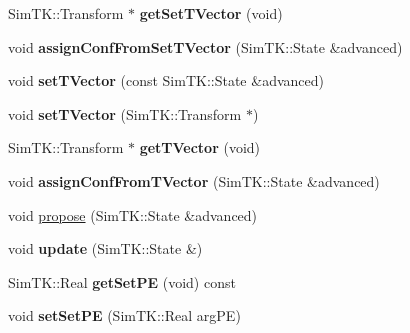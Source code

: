 \begin{DoxyCompactItemize}
\item 
Sim\+T\+K\+::\+Transform $\ast$ {\bfseries get\+Set\+T\+Vector} (void)\hypertarget{classMonteCarloSampler_a381114ca6245e61809691a5b8efec354}{}\label{classMonteCarloSampler_a381114ca6245e61809691a5b8efec354}

\item 
void {\bfseries assign\+Conf\+From\+Set\+T\+Vector} (Sim\+T\+K\+::\+State \&advanced)\hypertarget{classMonteCarloSampler_aff4c58f725a9b1b5cafe1e6afe70272a}{}\label{classMonteCarloSampler_aff4c58f725a9b1b5cafe1e6afe70272a}

\item 
void {\bfseries set\+T\+Vector} (const Sim\+T\+K\+::\+State \&advanced)\hypertarget{classMonteCarloSampler_af8cbc49beae7f81cc0d560953424b049}{}\label{classMonteCarloSampler_af8cbc49beae7f81cc0d560953424b049}

\item 
void {\bfseries set\+T\+Vector} (Sim\+T\+K\+::\+Transform $\ast$)\hypertarget{classMonteCarloSampler_a42c51f9eb62489ebb715a945742556b2}{}\label{classMonteCarloSampler_a42c51f9eb62489ebb715a945742556b2}

\item 
Sim\+T\+K\+::\+Transform $\ast$ {\bfseries get\+T\+Vector} (void)\hypertarget{classMonteCarloSampler_a010b453ab1e2cf910370c2a983ac9459}{}\label{classMonteCarloSampler_a010b453ab1e2cf910370c2a983ac9459}

\item 
void {\bfseries assign\+Conf\+From\+T\+Vector} (Sim\+T\+K\+::\+State \&advanced)\hypertarget{classMonteCarloSampler_ab72a7be6ee6960ed6695276d1ae7f81e}{}\label{classMonteCarloSampler_ab72a7be6ee6960ed6695276d1ae7f81e}

\item 
void \hyperlink{classMonteCarloSampler_af35ad7b12d462b867b968e3ec8194c05}{propose} (Sim\+T\+K\+::\+State \&advanced)
\item 
void {\bfseries update} (Sim\+T\+K\+::\+State \&)\hypertarget{classMonteCarloSampler_aea26d5e94570b2c3ba27e4b8c75de3ac}{}\label{classMonteCarloSampler_aea26d5e94570b2c3ba27e4b8c75de3ac}

\item 
Sim\+T\+K\+::\+Real {\bfseries get\+Set\+PE} (void) const \hypertarget{classMonteCarloSampler_a574c8cc51d4d4a77dff0094a8bf7ab94}{}\label{classMonteCarloSampler_a574c8cc51d4d4a77dff0094a8bf7ab94}

\item 
void {\bfseries set\+Set\+PE} (Sim\+T\+K\+::\+Real arg\+PE)\hypertarget{classMonteCarloSampler_aee20844deef1624d0e49133b5da7267d}{}\label{classMonteCarloSampler_aee20844deef1624d0e49133b5da7267d}


\end{DoxyCompactItemize}
